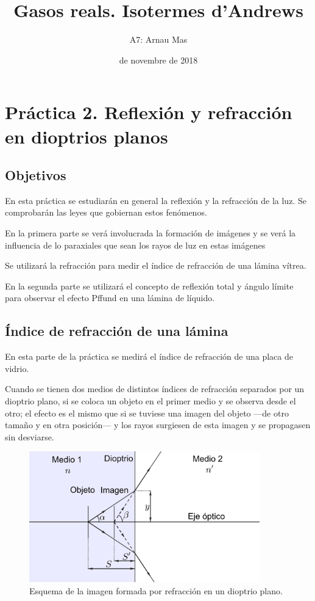 \documentclass[12pt]{article}
\title{\sffamily {\bfseries Informe IV:} Gasos reals. Isotermes d'Andrews}
\author{\sffamily A7: Arnau Mas}
\date{\sffamily 12 de novembre de 2018}
\numberwithin{table}{section}
\numberwithin{figure}{section}
\numberwithin{equation}{section}
\begin{document}
\maketitle

\section{Práctica 2. Reflexión y refracción en dioptrios planos}
\subsection{Objetivos}
En esta práctica se estudiarán en general la reflexión y la refracción de la luz. Se comprobarán las leyes que gobiernan estos fenómenos.

En la primera parte se verá involucrada la formación de imágenes y se verá la influencia de lo paraxiales que sean los rayos de luz en estas imágenes

Se utilizará la refracción para medir el índice de refracción de una lámina vítrea.

En la segunda parte se utilizará el concepto de reflexión total y ángulo límite para observar el efecto Pffund en una lámina de líquido.

\subsection{Índice de refracción de una lámina}
En esta parte de la práctica se medirá el índice de refracción de una placa de vidrio.

Cuando se tienen dos medios de distintos índices de refracción separados por un dioptrio plano, si se coloca un objeto en el primer medio y se observa desde el otro; el efecto es el mismo que si se tuviese una imagen del objeto ---de otro tamaño y en otra posición--- y los rayos surgiesen de esta imagen y se propagasen sin desviarse.

\begin{figure}[!ht]
\begin{center}
\includegraphics[width=10cm]{P2Refraccion.png}
\caption{Esquema de la imagen formada por refracción en un dioptrio plano.}
\label{P2refraccion}
\end{center}
\end{figure}
\end{document}
